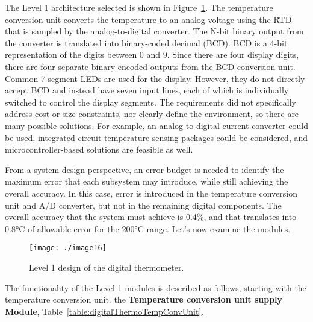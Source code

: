 The Level 1 architecture selected is shown in 
Figure~\ref{figure:level1DigitalThermo}. The
temperature conversion unit converts the temperature to an analog
voltage using the RTD that is sampled by the analog-to-digital
converter. The N-bit binary output from the converter is translated into
binary-coded decimal (BCD). BCD is a 4-bit representation of the digits
between 0 and 9. Since there are four display digits, there are four
separate binary encoded outputs from the BCD conversion unit. Common
7-segment LEDs are used for the display. However, they do not directly
accept BCD and instead have seven input lines, each of which is
individually switched to control the display segments. The requirements
did not specifically address cost or size constraints, nor clearly
define the environment, so there are many possible solutions. For
example, an analog-to-digital current converter could be used,
integrated circuit temperature sensing packages could be considered, and
microcontroller-based solutions are feasible as well.

From a system design perspective, an error budget is needed to identify
the maximum error that each subsystem may introduce, while still
achieving the overall accuracy. In this case, error is introduced in the
temperature conversion unit and A/D converter, but not in the remaining
digital components. The overall accuracy that the system must achieve is
0.4\%, and that translates into 0.8°C of allowable error for the 200°C
range. Let's now examine the modules.

\begin{figure}[h]
\centering
\texttt{[image: ./image16]}
\caption{Level 1 design of the digital thermometer.}
\label{figure:level1DigitalThermo}
\end{figure}

The functionality of the Level 1 modules is described as follows,
starting with the temperature conversion unit.
the \textbf{Temperature conversion unit supply Module}, 
Table~\ref{table:digitalThermoTempConvUnit}.


